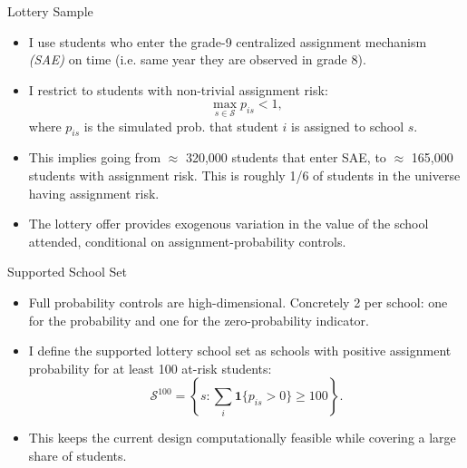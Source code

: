 \documentclass[notes,11pt,aspectratio=169]{beamer}
\newenvironment{wideitemize}{%
  \begin{minipage}{0.90\textwidth}
  \begin{itemize}
  \addtolength{\itemsep}{1em}
}{%
  \end{itemize}
  \end{minipage}
}
\begin{document}
\begin{frame}{Lottery Sample}
\begin{wideitemize}
  \item I use students who enter the grade-9 centralized assignment mechanism \textit{(SAE)} on time (i.e.  same year they are observed in grade 8). 

  \item I restrict to students with non-trivial assignment risk:
  \[
    \max_{s\in\mathcal{S}} p_{is}<1,
  \]
  where \(p_{is}\) is the simulated prob. that student \(i\) is assigned to school \(s\).

  \item This implies going from $\approx$ 320,000 students that enter SAE, to $\approx$ 165,000 students with assignment risk. This is roughly 1/6 of students in the universe having assignment risk. 

  \item The lottery offer provides exogenous variation in the value of the school attended, conditional on assignment-probability controls.
\end{wideitemize}
\end{frame}

\begin{frame}{Supported School Set}
\begin{wideitemize}
  \item Full probability controls are high-dimensional. Concretely 2 per school: one for the probability and one for the zero-probability indicator.

  \item I define the supported lottery school set as schools with positive assignment probability for at least 100 at-risk students:
  \[
  \mathcal{S}^{100}
  =
  \left\{
  s:
  \sum_i \mathbf{1}\{p_{is}>0\}
  \geq 100
  \right\}.
  \]

  \item This keeps the current design computationally feasible while covering a large share of students.
\end{wideitemize}
\end{frame}
\end{document}
